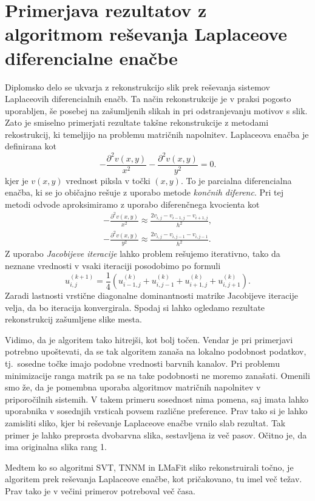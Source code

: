 \section{Primerjava rezultatov z algoritmom re\-še\-van\-ja Laplaceove diferencialne enačbe} \label{1307-2255}
Diplomsko delo \cite{ERZAR_2023} se ukvarja z rekonstrukcijo slik prek reševanja sistemov Laplaceovih diferencialnih enačb.
Ta način rekonstrukcije je v praksi pogosto uporabljen, še posebej na zašumljenih slikah in pri odstranjevanju motivov s slik. Zato je smiselno primerjati rezultate takšne rekonstrukcije z metodami rekostrukcij, ki temeljijo na problemu matričnih napolnitev.  Laplaceova enačba je definirana kot
\[
    -\frac{\partial^2v(x, y)}{x^2} - \frac{\partial^2v(x, y)}{y^2} = 0.
\]
kjer je $v(x,y)$ vrednost piksla v točki $(x, y)$. To je parcialna diferencialna enačba, ki se jo običajno rešuje z uporabo metode \textit{končnih diferenc}. Pri tej metodi odvode aproksimiramo z uporabo diferenčnega kvocienta kot
\begin{align*}
    -\frac{\partial^2v(x, y)}{x^2} \approx \frac{2v_{i,j} - v_{i-1, j} - v_{i+1, j}}{h^2}, \\
    -\frac{\partial^2v(x, y)}{y^2} \approx \frac{2v_{i,j} - v_{i, j-1} - v_{i, j-1}}{h^2}.
\end{align*}
Z uporabo \textit{Jacobijeve iteracije} \cite[pogl. 6]{demmel97} lahko problem rešujemo iterativno, tako da neznane vrednosti v vsaki iteraciji posodobimo po formuli
\[
    u_{i, j}^{(k+1)} = \frac{1}{4}(u_{i - 1, j}^{(k)} +  u_{i, j - 1}^{(k)} + u_{i + 1, j}^{(k)} + u_{i, j + 1}^{(k)}).
\]
Zaradi lastnosti vrstične diagonalne dominantnosti matrike Jacobijeve iteracije velja, da bo iteracija konvergirala. Spodaj si lahko ogledamo rezultate rekonstrukcij zašumljene slike mesta.

\FloatBarrier
Vidimo, da je algoritem tako hitrejši, kot bolj točen. Vendar je pri primerjavi potrebno upoštevati, da se tak algoritem zanaša na lokalno podobnost podatkov, tj.\ sosedne točke imajo podobne vrednosti barvnih kanalov. Pri problemu minimizacije ranga matrik pa se na take podobnosti ne moremo zanašati. Omenili smo že, da je pomembna uporaba algoritmov matričnih napolnitev v priporočilnih sistemih. V takem primeru sosednost nima pomena, saj imata lahko uporabnika v sosednjih vrsticah povsem različne preference. Prav tako si je lahko zamisliti sliko, kjer bi reševanje Laplaceove enačbe vrnilo slab rezultat. Tak primer je lahko preprosta dvobarvna slika, sestavljena iz več pasov. Očitno je, da ima originalna slika rang 1.

Medtem ko so algoritmi SVT, TNNM in LMaFit sliko rekonstruirali točno, je algoritem prek reševanja Laplaceove enačbe, kot pričakovano, tu imel več težav. Prav tako je v večini primerov potreboval več časa.


